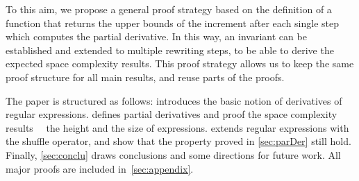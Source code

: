 To this aim, we propose a general proof strategy based on the definition of a function that returns the upper bounds of the increment after each single step which computes the partial derivative. In this way, an invariant can be established and extended to multiple rewriting steps, to be able to derive the expected space complexity results.  This proof strategy allows us to keep the same proof structure for all main results, and reuse parts of the proofs.

The paper is structured as follows:  introduces the basic notion of derivatives of regular expressions.  defines partial derivatives and proof the space complexity results ~\wrt~the height and the size of expressions.
 extends regular expressions with the shuffle operator, and show that the property proved in \cref{sec:parDer} still hold. Finally, \cref{sec:conclu} draws conclusions and some directions for future work. All major proofs are included in~\cref{sec:appendix}.

